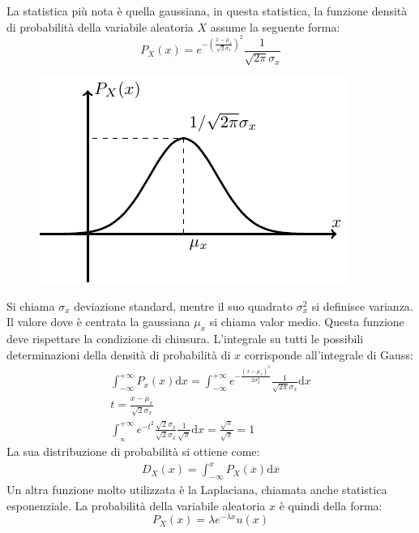 \documentclass{article}
\newcommand{\df}{\mathrm{d}}
\numberwithin{equation}{subsection}
\begin{document}
La statistica più nota è quella gaussiana, in questa statistica, la funzione densità di probabilità della variabile aleatoria $X$ assume la seguente forma:
\begin{equation}
    P_X(x)=\displaystyle e^{-\left(\frac{x-\mu_x}{\sqrt{2}\sigma_x}\right)^2}\frac{1}{\sqrt{2\pi}\sigma_x}
\end{equation}
\begin{figure}[H]%
    \centering
    \includegraphics{gaussiana-2.pdf}%
\end{figure}
Si chiama $\sigma_x$ deviazione standard, mentre il suo quadrato $\sigma_x^2$ si definisce varianza. Il valore dove è centrata la gaussiana $\mu_x$ si chiama valor medio. 
Questa funzione deve rispettare la condizione di chiusura. 
L'integrale su tutti le possibili determinazioni della densità di probabilità di $x$ corrisponde all'integrale di Gauss:
\begin{gather*}
    \displaystyle\int_{-\infty}^{+\infty}P_x(x)\df x=\int_{-\infty}^{+\infty}e^{-\frac{(x-\mu_x)^2}{2\sigma_x^2}}\frac{1}{\sqrt{2\pi}\sigma_x}\df x\\
    t=\displaystyle\frac{x-\mu_x}{\sqrt{2}\sigma_x}\\
    \displaystyle\int_{_\infty}^{+\infty}e^{-t^2}\frac{\sqrt{2}{\sigma_x}}{\sqrt{2}\sigma_x}\frac{1}{\sqrt{\pi}}{\df x}=\frac{\sqrt{\pi}}{\sqrt{\pi}}=1
\end{gather*}
La sua distribuzione di probabilità si ottiene come:
\begin{gather*}
    D_X(x)=\displaystyle\int_{-\infty}^xP_X(\overline{x})\df\overline{x}
\end{gather*}
Un altra funzione molto utilizzata è la Laplaciana, chiamata anche statistica esponenziale. La probabilità della variabile aleatoria $x$ è quindi della forma:
\begin{equation}
    P_X(x)=\lambda e^{-\lambda x}u(x)
\end{equation}
\end{document}
